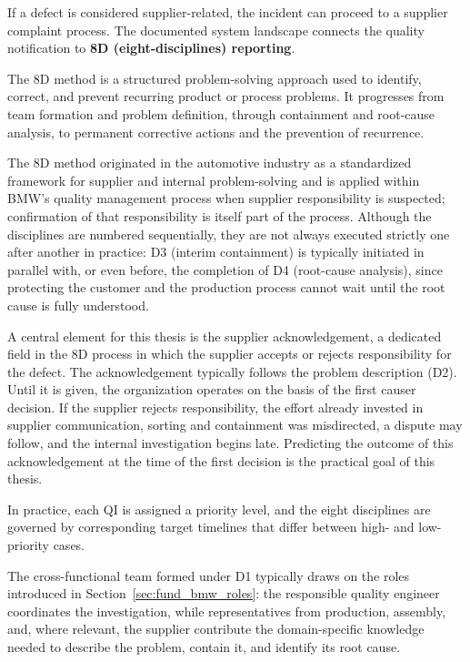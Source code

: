 If a defect is considered supplier-related, the incident can proceed to a
supplier complaint process. The documented system landscape connects the
quality notification to \textbf{8D (eight-disciplines) reporting}.

The 8D method is a structured problem-solving approach used to identify,
correct, and prevent recurring product or process problems. It progresses
from team formation and problem definition, through containment and
root-cause analysis, to permanent corrective actions and the prevention of
recurrence.

The 8D method originated in the automotive industry as a standardized
framework for supplier and internal problem-solving and is applied within
BMW's quality management process when supplier responsibility is
suspected; confirmation of that responsibility is itself part of the
process. Although the disciplines are numbered sequentially, they
are not always executed strictly one after another in practice: D3
(interim containment) is typically initiated in parallel with, or even
before, the completion of D4 (root-cause analysis), since protecting the
customer and the production process cannot wait until the root cause is
fully understood.

A central element for this thesis is the supplier acknowledgement, a
dedicated field in the 8D process in which the supplier accepts or rejects
responsibility for the defect. The acknowledgement typically follows the
problem description (D2). Until it is given, the organization operates on
the basis of the first causer decision. If the supplier rejects
responsibility, the effort already invested in supplier communication,
sorting and containment was misdirected, a dispute may follow, and the
internal investigation begins late. Predicting the outcome of this
acknowledgement at the time of the first decision is the practical goal of
this thesis.

In practice, each QI is assigned a priority level, and the eight
disciplines are governed by corresponding target timelines that differ
between high- and low-priority cases.

The cross-functional team formed under D1 typically draws on the roles
introduced in Section~\ref{sec:fund_bmw_roles}: the responsible quality
engineer coordinates the investigation, while representatives from
production, assembly, and, where relevant, the supplier contribute the
domain-specific knowledge needed to describe the problem, contain it, and
identify its root cause.

